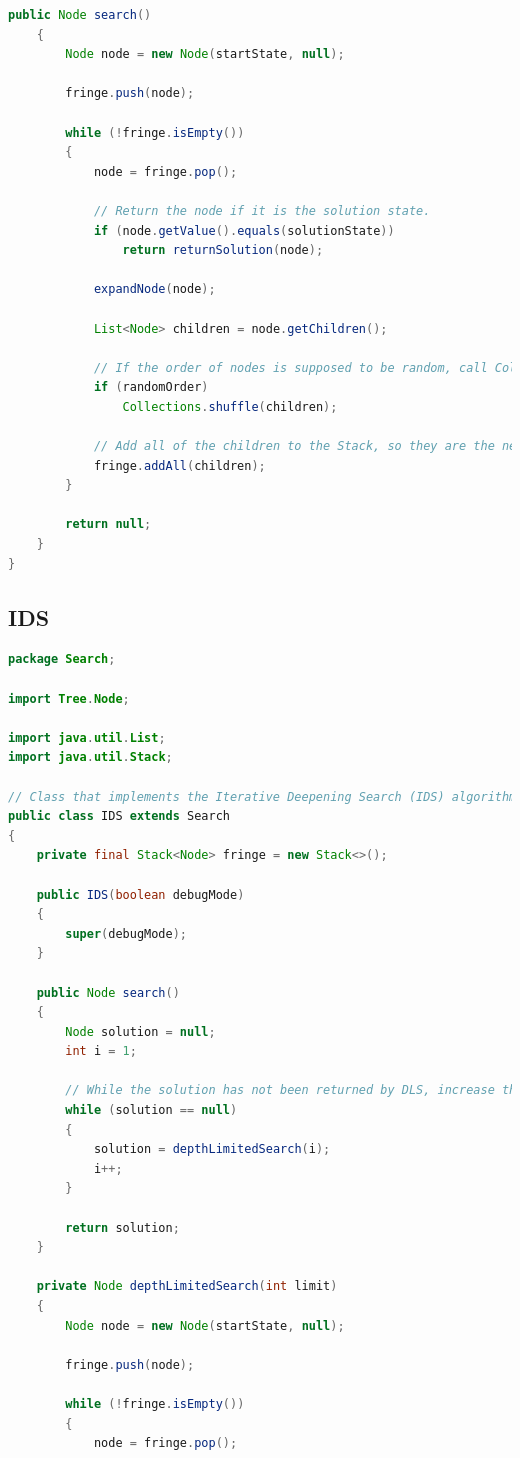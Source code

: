 \documentclass{article}
\begin{document}
\begin{appendices}
\begin{lstlisting}[language=Java]
	public Node search()
	{
		Node node = new Node(startState, null);
	
		fringe.push(node);
	
		while (!fringe.isEmpty())
		{
			node = fringe.pop();
		
			// Return the node if it is the solution state.
			if (node.getValue().equals(solutionState))
				return returnSolution(node);
			
			expandNode(node);
			
			List<Node> children = node.getChildren();
			
			// If the order of nodes is supposed to be random, call Collections.shuffle on the children ArrayList.
			if (randomOrder)
				Collections.shuffle(children);
			
			// Add all of the children to the Stack, so they are the next nodes to be checked.
			fringe.addAll(children);
		}
	
		return null;
	}
}
\end{lstlisting}
		
		\newpage
		\subsection{IDS}
\begin{lstlisting}[language=Java]
package Search;

import Tree.Node;

import java.util.List;
import java.util.Stack;

// Class that implements the Iterative Deepening Search (IDS) algorithm by using a Depth Limited Search (DLS), a modified version of DFS that stops at a certain limit, and then iterates this algorithm until a solution is found.
public class IDS extends Search
{
	private final Stack<Node> fringe = new Stack<>();
	
	public IDS(boolean debugMode)
	{
		super(debugMode);
	}
	
	public Node search()
	{
		Node solution = null;
		int i = 1;
	
		// While the solution has not been returned by DLS, increase the limit by 1.
		while (solution == null)
		{
			solution = depthLimitedSearch(i);
			i++;
		}
	
		return solution;
	}
	
	private Node depthLimitedSearch(int limit)
	{
		Node node = new Node(startState, null);
	
		fringe.push(node);
	
		while (!fringe.isEmpty())
		{
			node = fringe.pop();
		

\end{lstlisting}
\end{appendices}
\end{document}
